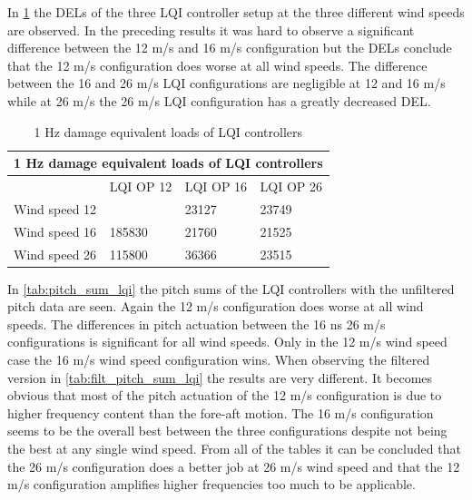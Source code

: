 \newpage

In \cref{tab:del_lqi} the DELs of the three LQI controller setup at the three different wind speeds are observed. In the preceding results it was hard to observe a significant difference between the 12 m/s and 16 m/s configuration but the DELs conclude that the 12 m/s configuration does worse at all wind speeds. The difference between the 16 and 26 m/s LQI configurations are negligible at 12 and 16 m/s while at 26 m/s the 26 m/s LQI configuration has a greatly decreased DEL.

\begin{table}[ht]
	\centering
	\caption{1 Hz damage equivalent loads of LQI controllers}
	\label{tab:del_lqi}
	\begin{tabular}{@{}|llll|@{}}
		\toprule
		\multicolumn{4}{|c|}{1 Hz damage equivalent loads of LQI controllers}                                                                                                                                \\ \midrule
		\multicolumn{1}{|l|}{}              & \multicolumn{1}{l|}{LQI OP 12}                                            & \multicolumn{1}{l|}{LQI OP 16}                     & LQI OP 26                     \\ \midrule
		\multicolumn{1}{|l|}{Wind speed 12} & \multicolumn{1}{l|}{\cellcolor[HTML]{FFCCC9}{\color[HTML]{333333} 24132}} & \multicolumn{1}{l|}{\cellcolor[HTML]{9AFF99}23127} & 23749                         \\ \midrule
		\multicolumn{1}{|l|}{Wind speed 16} & \multicolumn{1}{l|}{\cellcolor[HTML]{FFCCC9}185830}                       & \multicolumn{1}{l|}{21760}                         & \cellcolor[HTML]{9AFF99}21525 \\ \midrule
		\multicolumn{1}{|l|}{Wind speed 26} & \multicolumn{1}{l|}{\cellcolor[HTML]{FFCCC9}115800}                       & \multicolumn{1}{l|}{36366}                         & \cellcolor[HTML]{9AFF99}23515 \\ \bottomrule
	\end{tabular}
\end{table}

In \cref{tab:pitch_sum_lqi} the pitch sums of the LQI controllers with the unfiltered pitch data are seen. Again the 12 m/s configuration does worse at all wind speeds. The differences in pitch actuation between the 16 ns 26 m/s configurations is significant for all wind speeds. Only in the 12 m/s wind speed case the 16 m/s wind speed configuration wins. When observing the filtered version in \cref{tab:filt_pitch_sum_lqi} the results are very different. It becomes obvious that most of the pitch actuation of the 12 m/s configuration is due to higher frequency content than the fore-aft motion. The 16 m/s configuration seems to be the overall best between the three configurations despite not being the best at any single wind speed. From all of the tables it can be concluded that the 26 m/s configuration does a better job at 26 m/s wind speed and that the 12 m/s configuration amplifies higher frequencies too much to be applicable.

